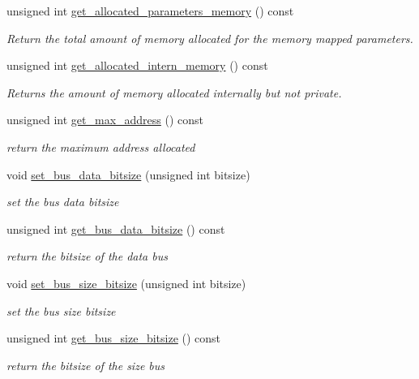 \begin{DoxyCompactItemize}
unsigned int \hyperlink{classmemory_a580103df3eb36abe6d53f31b7fba7fed}{get\+\_\+allocated\+\_\+parameters\+\_\+memory} () const
\begin{DoxyCompactList}\small\item\em Return the total amount of memory allocated for the memory mapped parameters. \end{DoxyCompactList}\item 
unsigned int \hyperlink{classmemory_a779906886ca81a3ed86aaa2b3c69d4f0}{get\+\_\+allocated\+\_\+intern\+\_\+memory} () const
\begin{DoxyCompactList}\small\item\em Returns the amount of memory allocated internally but not private. \end{DoxyCompactList}\item 
unsigned int \hyperlink{classmemory_ae371f1c8d9b33b71254ecb705d7ff51d}{get\+\_\+max\+\_\+address} () const
\begin{DoxyCompactList}\small\item\em return the maximum address allocated \end{DoxyCompactList}\item 
void \hyperlink{classmemory_a2bfe7650482db62c431267c6cb01ccac}{set\+\_\+bus\+\_\+data\+\_\+bitsize} (unsigned int bitsize)
\begin{DoxyCompactList}\small\item\em set the bus data bitsize \end{DoxyCompactList}\item 
unsigned int \hyperlink{classmemory_a1db8e919be66e06ccc86dfce8fd40cec}{get\+\_\+bus\+\_\+data\+\_\+bitsize} () const
\begin{DoxyCompactList}\small\item\em return the bitsize of the data bus \end{DoxyCompactList}\item 
void \hyperlink{classmemory_a306423532042ca8f0effb744fc8f9931}{set\+\_\+bus\+\_\+size\+\_\+bitsize} (unsigned int bitsize)
\begin{DoxyCompactList}\small\item\em set the bus size bitsize \end{DoxyCompactList}\item 
unsigned int \hyperlink{classmemory_ac4ef6ce89bf9d654aba58fdc92c9a098}{get\+\_\+bus\+\_\+size\+\_\+bitsize} () const
\begin{DoxyCompactList}\small\item\em return the bitsize of the size bus \end{DoxyCompactList}\item 

\end{DoxyCompactItemize}

